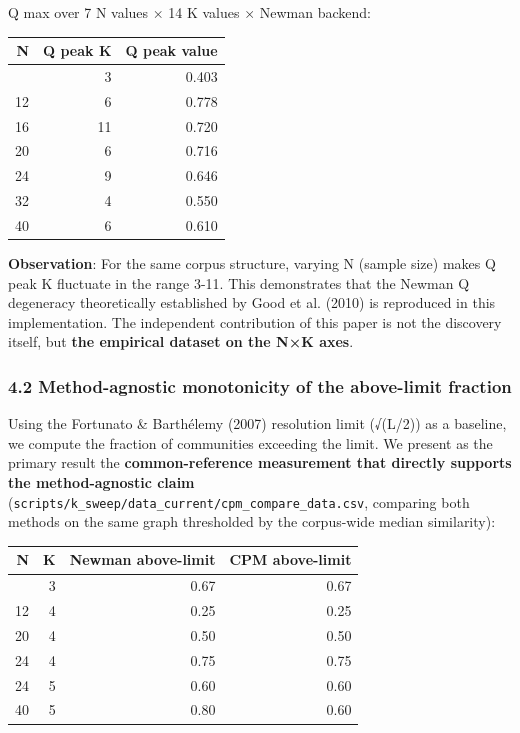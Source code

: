 \documentclass[
]{article}
\newcounter{none} %
\begin{document}
Q max over 7 N values × 14 K values × Newman backend:

{\def\LTcaptype{none} %
\begin{longtable}[]{@{}rrr@{}}
\toprule\noalign{}
N & Q peak K & Q peak value \\
\midrule\noalign{}
\endhead
\bottomrule\noalign{}
\endlastfoot
8 & 3 & 0.403 \\
12 & 6 & 0.778 \\
16 & 11 & 0.720 \\
20 & 6 & 0.716 \\
24 & 9 & 0.646 \\
32 & 4 & 0.550 \\
40 & 6 & 0.610 \\
\end{longtable}
}

\textbf{Observation}: For the same corpus structure, varying N (sample
size) makes Q peak K fluctuate in the range 3-11. This demonstrates that
the Newman Q degeneracy theoretically established by Good et al. (2010)
is reproduced in this implementation. The independent contribution of
this paper is not the discovery itself, but \textbf{the empirical
dataset on the N×K axes}.

\subsubsection{4.2 Method-agnostic monotonicity of the above-limit
fraction}\label{42-method-agnostic-monotonicity-of-the-above-limit-fraction}

Using the Fortunato \& Barthélemy (2007) resolution limit (√(L/2)) as a
baseline, we compute the fraction of communities exceeding the limit. We
present as the primary result the \textbf{common-reference measurement
that directly supports the method-agnostic claim}
(\texttt{scripts/k\_sweep/data\_current/cpm\_compare\_data.csv},
comparing both methods on the same graph thresholded by the corpus-wide
median similarity):

{\def\LTcaptype{none} %
\begin{longtable}[]{@{}rrrr@{}}
\toprule\noalign{}
N & K & Newman above-limit & CPM above-limit \\
\midrule\noalign{}
\endhead
\bottomrule\noalign{}
\endlastfoot
12 & 3 & 0.67 & 0.67 \\
12 & 4 & 0.25 & 0.25 \\
20 & 4 & 0.50 & 0.50 \\
24 & 4 & 0.75 & 0.75 \\
24 & 5 & 0.60 & 0.60 \\
40 & 5 & 0.80 & 0.60 \\
\end{longtable}
}
\end{document}
